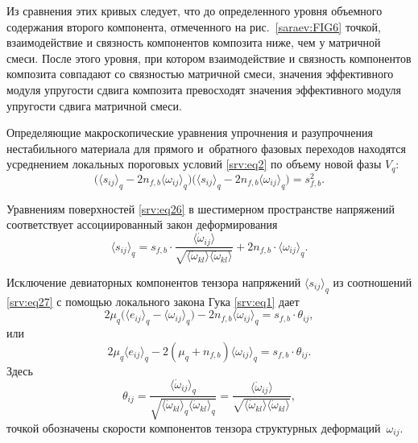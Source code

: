 Из сравнения этих кривых следует, что до определенного уровня объемного содержания второго компонента, отмеченного на рис.~\ref{saraev:FIG6} точкой, взаимодействие и связность компонентов композита ниже, чем у матричной смеси. После этого уровня, при котором взаимодействие и связность компонентов композита совпадают со связностью матричной смеси, значения эффективного модуля упругости сдвига композита превосходят значения эффективного модуля упругости сдвига матричной смеси.

\smallskip

Определяющие макроскопические уравнения упрочнения и разупрочнения нестабильного материала для прямого и~обратного фазовых переходов находятся усреднением локальных пороговых условий \eqref{srv:eq2} по объему новой фазы $V_{q}$:
\begin{equation}\label{srv:eq26}
\bigl( \langle{s_{ij}} \rangle_{q}-2 n_{f,b}  \langle{\omega_{ij}} \rangle_{q}\bigr) \bigl( \langle{s_{ij}} \rangle_{q}-2 n_{f,b} \langle{\omega_{ij}} \rangle_{q}\bigr)=s_{{f,b}}^{2}.
\end{equation}

Уравнениям поверхностей \eqref{srv:eq26} в шестимерном пространстве напряжений соответствует ассоциированный закон деформирования
\begin{equation}\label{srv:eq27}
\langle {s_{ij}} \rangle_{q}=s_{f,b}\cdot\dfrac{ \langle {\dot \omega_{ij}}  \rangle}{\sqrt{ \langle {\dot \omega_{kl}}  \rangle  
\langle {\dot \omega_{kl}}  \rangle}}+2 n_{f,b}\cdot  \langle{\omega_{ij}} \rangle_{q}.
\end{equation}

Исключение  девиаторных компонентов тензора напряжений $ \langle {s_{ij}} \rangle_{q}$ из соотношений \eqref{srv:eq27}  с помощью локального закона Гука \eqref{srv:eq1}  дает 
\begin{equation}
2\mu_{q} \bigl( \langle  {e_{ij}}  \rangle _{q}- \langle  {\omega_{ij}}  \rangle _{q} \bigr)-2 n_{f,b} \langle {\omega_{ij}} \rangle _{q}=s_{f,b}\cdot\theta_{ij},
\end{equation}
или 
\begin{equation}\label{srv:eq28}
2\mu_{q}  \langle  {e_{ij}}  \rangle _{q}-2 (\mu_{q}+n_{f,b} ) \langle {\omega_{ij}} \rangle _{q}=s_{f,b}\cdot\theta_{ij}.
\end{equation} 
Здесь 
$$\theta_{ij}=\dfrac{ \langle  {\dot \omega_{ij}}  \rangle _{q}}{\sqrt{ \langle  {\dot \omega_{kl}}  \rangle _{q} \langle  {\dot \omega_{kl}}  \rangle _{q}}}=\dfrac{ \langle  {\dot \omega_{ij}} \rangle }{\sqrt{ \langle  {\dot \omega_{kl}}  \rangle  \langle  {\dot \omega_{kl}}  \rangle }},$$ 
точкой обозначены скорости компонентов тензора структурных деформаций~$\omega_{ij}$.


